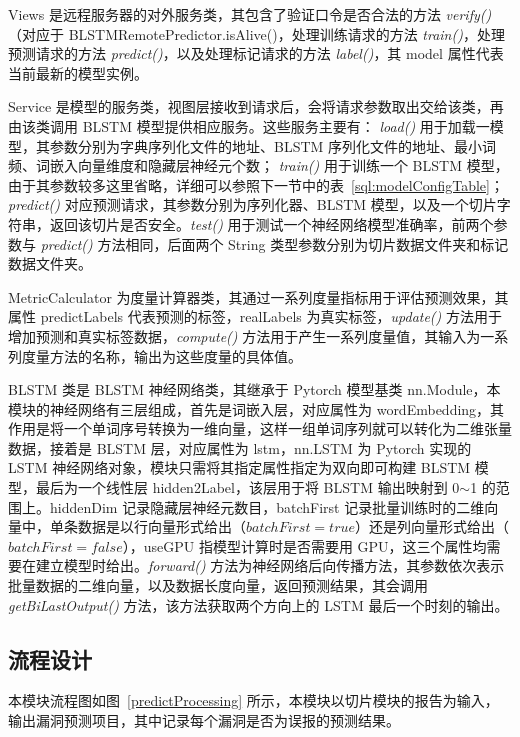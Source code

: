 Views 是远程服务器的对外服务类，其包含了验证口令是否合法的方法 \textit{verify()}（对应于 BLSTMRemotePredictor.isAlive()，处理训练请求的方法 \textit{train()}，处理预测请求的方法 \textit{predict()}，以及处理标记请求的方法 \textit{label()}，其 model 属性代表当前最新的模型实例。

Service 是模型的服务类，视图层接收到请求后，会将请求参数取出交给该类，再由该类调用 BLSTM 模型提供相应服务。这些服务主要有： \textit{load()} 用于加载一模型，其参数分别为字典序列化文件的地址、BLSTM 序列化文件的地址、最小词频、词嵌入向量维度和隐藏层神经元个数； \textit{train()} 用于训练一个 BLSTM 模型，由于其参数较多这里省略，详细可以参照下一节中的表~\ref{sql:modelConfigTable}； \textit{predict()} 对应预测请求，其参数分别为序列化器、BLSTM 模型，以及一个切片字符串，返回该切片是否安全。\textit{test()} 用于测试一个神经网络模型准确率，前两个参数与 \textit{predict()} 方法相同，后面两个 String 类型参数分别为切片数据文件夹和标记数据文件夹。

MetricCalculator 为度量计算器类，其通过一系列度量指标用于评估预测效果，其属性 predictLabels 代表预测的标签，realLabels 为真实标签，\textit{update()} 方法用于增加预测和真实标签数据，\textit{compute()} 方法用于产生一系列度量值，其输入为一系列度量方法的名称，输出为这些度量的具体值。

BLSTM 类是 BLSTM 神经网络类，其继承于 Pytorch 模型基类 nn.Module，本模块的神经网络有三层组成，首先是词嵌入层，对应属性为 wordEmbedding，其作用是将一个单词序号转换为一维向量，这样一组单词序列就可以转化为二维张量数据，接着是 BLSTM 层，对应属性为 lstm，nn.LSTM 为 Pytorch 实现的 LSTM 神经网络对象，模块只需将其指定属性指定为双向即可构建 BLSTM 模型，最后为一个线性层 hidden2Label，该层用于将 BLSTM 输出映射到 0$\sim$1 的范围上。hiddenDim 记录隐藏层神经元数目，batchFirst 记录批量训练时的二维向量中，单条数据是以行向量形式给出（$batchFirst=true$）还是列向量形式给出（$batchFirst=false$），useGPU 指模型计算时是否需要用 GPU，这三个属性均需要在建立模型时给出。\textit{forward()} 方法为神经网络后向传播方法，其参数依次表示批量数据的二维向量，以及数据长度向量，返回预测结果，其会调用 \textit{getBiLastOutput()} 方法，该方法获取两个方向上的 LSTM 最后一个时刻的输出。

\subsection{流程设计}

本模块流程图如图~\ref{predictProcessing} 所示，本模块以切片模块的报告为输入，输出漏洞预测项目，其中记录每个漏洞是否为误报的预测结果。

